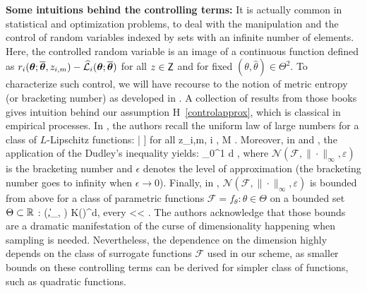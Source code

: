\documentclass[11pt]{article}
\makeatletter
\theoremstyle{t}
\DeclareRobustCommand*\cal{\@fontswitch\relax\mathcal}
\makeatother
\begin{document}
\textbf{Some intuitions behind the controlling terms:} It is actually common in statistical and optimization problems, to deal with the manipulation and the control of random variables indexed by sets with an infinite number of elements. Here, the controlled random variable is an image of a continuous function defined as $r_i (\param ; \op, z_{i,m})  - \sur{i}{\param}{\op}$ for all $z \in \Zset$ and for fixed $(\theta, \hat{\theta}) \in \Theta^2$.
To characterize such control, we will have recourse to the notion of metric entropy (or bracketing number) as developed in \citep{van2000asymptotic, vershynin2018high, wainwright2019high}.
A collection of results from those books gives intuition behind our assumption H~\ref{controlapprox}, which is classical in empirical processes.
In \citep[Theorem 8.2.3]{vershynin2018high}, the authors recall the uniform law of large numbers for a class of $L$-Lipschitz functions:
\beq\notag
\EE \left[\underset{f \in \mathcal{F}}{ \sup } \left|\frac{1}{M} \sum_{i=1}^{M} f\left(z_{i,m}\right)-\EE[f(z_i)]\right| \right] \leq {} \quad \textrm{for all} \quad z_{i,m}, i \in {}, M \rrbracket\eqsp.
\eeq
Moreover, in \citep[Theorem 8.1.3 ]{vershynin2018high} and \citep[Theorem 5.22]{wainwright2019high}, the application of the Dudley's inequality yields:
\beq\notag
\EE {} \leq {} \int_{0}^{1}  d \varepsilon\eqsp,
\eeq
where $\mathcal{N}\left(\mathcal{F},\|\cdot\|_{\infty}, \varepsilon\right)$ is the bracketing number and $\epsilon$ denotes the level of approximation (the bracketing number goes to infinity when $\epsilon  \to 0$). Finally, in \citep[p.271, Example]{van2000asymptotic}, $\mathcal{N}\left(\mathcal{F},\|\cdot\|_{\infty}, \varepsilon\right)$ is bounded from above for a class of parametric functions $ \mathcal{F}= {f_{\theta}: \theta \in \Theta}$ on a bounded set $\Theta \subset \rset$ :
\beq\notag
{}\left(,\|\cdot\|_{\infty}, \varepsilon\right) \leq K\left(\right)^{d}, \quad \textrm{every} <\varepsilon< \Theta\eqsp.
\eeq
The authors acknowledge that those bounds are a dramatic manifestation of the curse of dimensionality happening when sampling is needed.
Nevertheless, the dependence on the dimension highly depends on the class of surrogate functions $\mathcal{F}$ used in our scheme, as smaller bounds on these controlling terms can be derived for simpler class of functions, such as quadratic functions.
\end{document}

